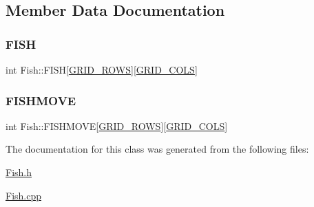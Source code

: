 \subsection{Member Data Documentation}
\mbox{\label{class_fish_ab77a195537e7505d26b3347a4a4d2776}} 
\subsubsection{\texorpdfstring{F\+I\+SH}{FISH}}
{\footnotesize\ttfamily int Fish\+::\+F\+I\+SH\mbox{[}\mbox{\hyperlink{_config_8h_a5ba0b105774bfdc09ce545d73dcdedd3}{G\+R\+I\+D\+\_\+\+R\+O\+WS}}\mbox{]}\mbox{[}\mbox{\hyperlink{_config_8h_a881e2cda79b5951641b07f678f6ef929}{G\+R\+I\+D\+\_\+\+C\+O\+LS}}\mbox{]}}

\mbox{\label{class_fish_ac362bdf589cc5638f43a5449b6ed9c1f}} 
\subsubsection{\texorpdfstring{F\+I\+S\+H\+M\+O\+VE}{FISHMOVE}}
{\footnotesize\ttfamily int Fish\+::\+F\+I\+S\+H\+M\+O\+VE\mbox{[}\mbox{\hyperlink{_config_8h_a5ba0b105774bfdc09ce545d73dcdedd3}{G\+R\+I\+D\+\_\+\+R\+O\+WS}}\mbox{]}\mbox{[}\mbox{\hyperlink{_config_8h_a881e2cda79b5951641b07f678f6ef929}{G\+R\+I\+D\+\_\+\+C\+O\+LS}}\mbox{]}}



The documentation for this class was generated from the following files\+:\begin{DoxyCompactItemize}
\item 
\mbox{\hyperlink{_fish_8h}{Fish.\+h}}\item 
\mbox{\hyperlink{_fish_8cpp}{Fish.\+cpp}}\end{DoxyCompactItemize}
